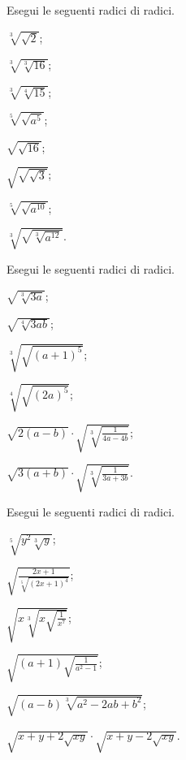 \begin{esercizio}[\Ast]
 \label{ese:2.60}
Esegui le seguenti radici di radici.
 \begin{multicols}{4}
 \begin{enumeratea}
 \item $\sqrt[3]{\sqrt 2}$;
 \item $\sqrt[3]{\sqrt[3]{16}}$;
 \item $\sqrt[3]{\sqrt[4]{15}}$;
 \item $\sqrt[5]{\sqrt{a^5}}$;
 \item $\sqrt{\sqrt{16}}$;
 \item $\sqrt{\sqrt{\sqrt 3}}$;
 \item $\sqrt[5]{\sqrt{a^{10}}}$;
 \item $\sqrt[3]{\sqrt{\sqrt[3]{a^{12}}}}$.
 \end{enumeratea}
 \end{multicols}
\end{esercizio}

\begin{esercizio}[\Ast]
 \label{ese:2.61}
Esegui le seguenti radici di radici.
\begin{multicols}{2}
 \begin{enumeratea}
 \item $\sqrt{\sqrt[3]{3a}}$;
 \item $\sqrt{\sqrt[4]{3ab}}$;
 \item $\sqrt[3]{\sqrt{(a+1)^5}}$;
 \item $\sqrt[4]{\sqrt{(2a)^5}}$;
 \item $\sqrt{2(a-b)}\cdot \sqrt{\sqrt[3]{\frac 1{4a-4b}}}$;
 \item $\sqrt{3(a+b)}\cdot \sqrt{\sqrt[3]{\frac 1{3a+3b}}}$.
 \end{enumeratea}
 \end{multicols}
\end{esercizio}
\pagebreak
\begin{esercizio}[\Ast]
 \label{ese:2.62}
Esegui le seguenti radici di radici.
\begin{multicols}{2}
 \begin{enumeratea}
 \item $\sqrt[5]{y^{2}\sqrt[3]{y}}$;
 \item $\sqrt{\frac{2x+1}{\sqrt[5]{(2x+1)^{4}}}}$;
 \item $\sqrt{x\sqrt[3]{x\sqrt{\frac{1}{x^{7}}}}}$;
 \item $\sqrt{(a+1)\sqrt{\frac{1}{a^{2}-1}}}$;
 \item $\sqrt{(a-b)\sqrt[3]{a^{2}-2ab+b^{2}}}$;
 \item $\sqrt{x+y+2\sqrt{xy}}\cdot\sqrt{x+y-2\sqrt{xy}}$.
 \end{enumeratea}
 \end{multicols}
\end{esercizio}

